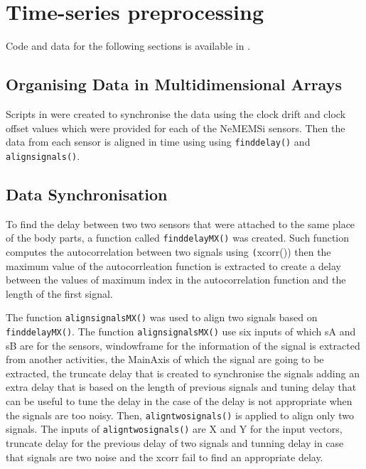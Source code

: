 \section{Time-series preprocessing}

Code and data for the following sections is available in 
\citep{xochicale2018}. 

\subsection{Organising Data in Multidimensional Arrays}
Scripts in \MATLAB were created to synchronise the data using the clock 
drift and clock offset values which were provided for each of the 
NeMEMSi sensors. Then the data from each sensor is aligned in 
time using using \texttt{finddelay()} and \texttt{alignsignals()}.

\subsection{Data Synchronisation}
To find the delay between two two sensors that were attached to the same place
of the body parts, a function called  \texttt{finddelayMX()} was created.
Such function computes the autocorrelation between two signals using 
\texttt(xcorr())
then the maximum value of the autocorrleation function is extracted
to create a delay between the values of maximum index in the autocorrelation
function and the length of the first signal.

The function \texttt{alignsignalsMX()} was used to align two signals based
on \texttt{finddelayMX()}. The function \texttt{alignsignalsMX()} use six inputs
of which sA and sB are for the sensors, windowframe for the information
of the signal is extracted from another activities, 
the MainAxis of which the signal are going to be extracted, 
the truncate delay that is created to
synchronise the signals adding an extra delay that is based on the length of
previous signals 
and tuning delay that can be useful to tune the delay in the
case of the delay is not appropriate when the signals are too noisy.
Then, \texttt{aligntwosignals()} is applied to align only two signals.
The inputs of \texttt{aligntwosignals()} are X and Y for the input vectors,
truncate delay for the previous delay of two signals and tunning delay
in case that signals are two noise and the xcorr fail to find an appropriate
delay.

